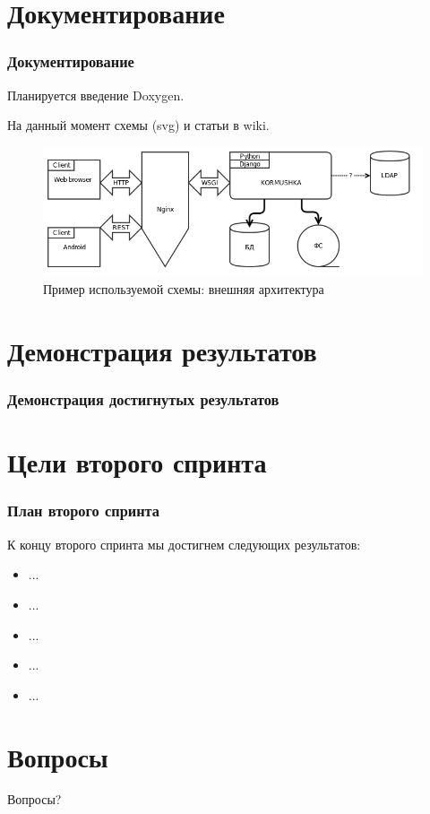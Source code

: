 \documentclass{beamer}
\newlength{\wideitemsep}
\let\olditem\item
\renewcommand{\item}{\setlength{\itemsep}{\wideitemsep}\olditem}
\begin{document}
\section{Документирование}

\begin{frame}
\frametitle{Документирование}

Планируется введение Doxygen.

На данный момент схемы (svg) и статьи в wiki.

\begin{figure}
\includegraphics[scale=0.60]{res/r2_kormushka_ext}
\caption{Пример используемой схемы: внешняя архитектура}
\end{figure}


\end{frame}


\section{Демонстрация результатов}

\begin{frame}
\frametitle{Демонстрация достигнутых результатов}



\end{frame}

\section{Цели второго спринта}

\begin{frame}
\frametitle{План второго спринта}

К концу второго спринта мы достигнем следующих результатов:
\medskip
\begin{itemize}
\item ...
\item ...
\item ...
\item ...
\item ...
\end{itemize}

\end{frame}

\section{Вопросы}

\begin{frame}
\Huge{\centerline{Вопросы?}}
\end{frame}

\end{document}
